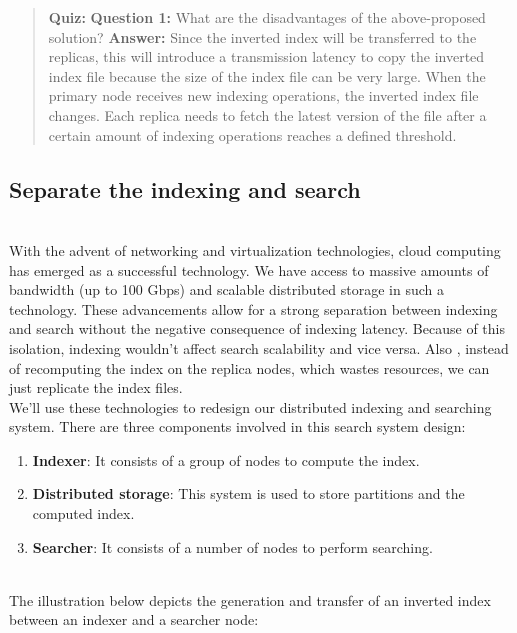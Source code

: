 \begin{quote}
\textbf{Quiz:}
\textbf{Question 1:} What are the disadvantages of the above-proposed solution?
\textbf{Answer:} Since the inverted index will be transferred to the replicas, this will introduce a transmission latency to copy the inverted index file because the size of the index file can be very large. When the primary node receives new indexing operations, the inverted index file changes. Each replica needs to fetch the latest version of the file after a certain amount of indexing operations reaches a defined threshold.
\end{quote}

\subsection{Separate the indexing and search}\label{Zcib-WIX4K5orKf0SRV9I}
\\
With the advent of networking and virtualization technologies, cloud computing has emerged as a successful technology. We have access to massive amounts of bandwidth (up to 100 Gbps) and scalable distributed storage in such a technology. These advancements allow for a strong separation between indexing and search without the negative consequence of indexing latency. Because of this isolation, indexing wouldn't affect search scalability and vice versa. Also , instead of recomputing the index on the replica nodes, which wastes resources, we can just replicate the index files.
\\
We'll use these technologies to redesign our distributed indexing and searching system. There are three components involved in this search system design:

\begin{enumerate}
\item
\protect{}\label{5I2usiyXng9raHHeYvxOH}
\textbf{Indexer}: It consists of a group of nodes to compute the index.
\item
\protect{}\label{TyRVsiDM_x2rk22MuskDK}
\textbf{Distributed storage}: This system is used to store partitions and the computed index.
\item
\protect{}\label{99VMU9jPVdENCQRbBjbo_}
\textbf{Searcher}: It consists of a number of nodes to perform searching.
\end{enumerate}
\\
The illustration below depicts the generation and transfer of an inverted index between an indexer and a searcher node:

